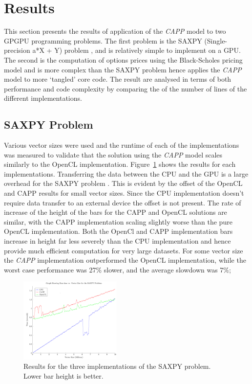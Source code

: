 \documentclass{sig-alternate-05-2015}
\begin{document}
\section{Results}\label{sec:results}

This section presents the results of application of the \textit{CAPP} model to two
GPGPU programming problems. The first problem is the SAXPY
(Single-precision a*X + Y) problem \cite{harris:saxpy}, and is relatively 
simple to implement on a GPU. The
second is the computation of options prices using the Black-Scholes pricing
model \cite{gems:blackscholes} and
is more complex than the SAXPY problem hence applies the \textit{CAPP} model 
to more `tangled' core code. The result are analysed in terms of both performance 
and code complexity by comparing the of the number of lines of the different
implementations.

\subsection{SAXPY Problem}

Various vector sizes were used and the runtime of each of the implementations
was measured to validate that the solution using the
\textit{CAPP} model scales similarly to the OpenCL implementation. Figure~\ref{fig:saxpy} 
shows the results for each implementations. Transferring
the data between the CPU and the GPU is a large overhead for the SAXPY problem
\cite{gregg:saxpy}. This is evident by the offset of the
OpenCL and CAPP results for small vector sizes. Since the CPU implementation
doesn't require data transfer to an external device the offset is not present.
The rate of increase of the height of the bars for the CAPP and OpenCL solutions
are similar, with the CAPP implementation scaling slightly worse than the pure
OpenCL implementation. Both the OpenCl and CAPP implementation bars increase in
height far less severely than the CPU implementation and hence provide much
efficient computation for very large datasets. For some vector size the
\textit{CAPP} implementation outperformed the OpenCL implementation, while the
worst case performance was 27\% slower, and the average slowdown was 7\%;

\begin{figure}[!t]
	\centering
	\includegraphics[width=0.45\textwidth]{Saxpy}
	\caption{Results for the three implementations of the SAXPY problem. Lower
	bar height is better.}
	\label{fig:saxpy}
\end{figure}
\end{document}
